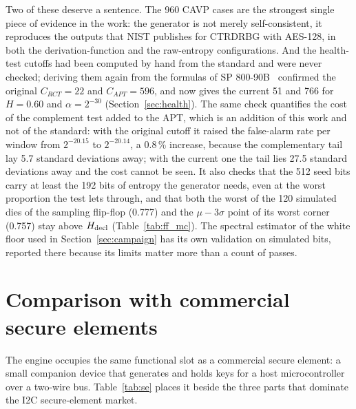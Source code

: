 Two of these deserve a sentence. The 960 \ac{CAVP} cases are the
strongest single piece of evidence in the work: the generator is not
merely self-consistent, it reproduces the outputs that \ac{NIST} publishes
for \ac{CTRDRBG} with AES-128, in both the derivation-function and the
raw-entropy configurations. And the health-test cutoffs had been computed
by hand from the standard and were never checked; deriving them again
from the formulas of SP 800-90B~\cite{turan_2018_sp80090b} confirmed the
original $C_{RCT} = 22$ and $C_{APT} = 596$, and now gives the current
51 and 766 for $H = 0.60$ and $\alpha = 2^{-30}$
(Section~\ref{sec:health}). The same check quantifies the cost of the
complement test added to the \ac{APT}, which is an addition of this work
and not of the standard: with the original cutoff it raised the
false-alarm rate per window from $2^{-20.15}$ to $2^{-20.14}$, a 0.8\,\%
increase, because the complementary tail lay 5.7 standard deviations
away; with the current one the tail lies 27.5 standard deviations away
and the cost cannot be seen. It also checks that the 512 seed bits carry
at least the 192 bits of entropy the generator needs, even at the worst
proportion the test lets through, and that both the worst of the 120
simulated dies of the sampling flip-flop (0.777) and the $\mu - 3\sigma$
point of its worst corner (0.757) stay above $H_{\mathrm{decl}}$
(Table~\ref{tab:ff_mc}). The spectral estimator of the white floor used
in Section~\ref{sec:campaign} has its own validation on simulated bits,
reported there because its limits matter more than a count of passes.

\section{Comparison with commercial secure elements}
\label{sec:se_comparison}

The engine occupies the same functional slot as a commercial secure
element: a small companion device that generates and holds keys for a host
microcontroller over a two-wire bus. Table~\ref{tab:se} places it beside
the three parts that dominate the \ac{I2C} secure-element market.

